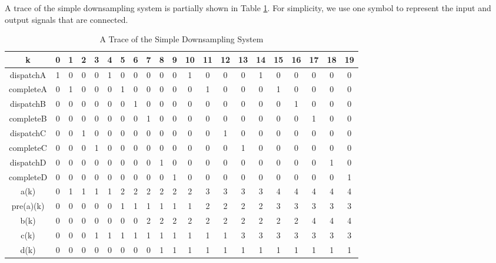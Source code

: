 A trace of the simple downsampling system is partially shown in Table \ref{tab:table1}. For simplicity, we use one symbol to represent the input and output signals that are connected.
\begin{table}[h!]
\begin{center}
\caption{A Trace of the Simple Downsampling System}
\label{tab:table1}
\begin{tabular}{ |c|c|c|c|c|c|c|c|c|c|c|c|c|c|c|c|c|c|c|c|c|} 
\hline
            k & 0 & 1 & 2 & 3 & 4 & 5 & 6 & 7 & 8 & 9 & 10  & 11 & 12 & 13 & 14 & 15 & 16 & 17 & 18 & 19 \\
\hline
dispatchA  & 1 & 0 & 0 & 0 & 1 & 0 & 0 & 0 & 0 & 0 & 1 & 0 & 0 & 0 & 1 & 0 & 0 & 0 & 0 & 0  \\ 
\hline
completeA & 0 & 1 & 0 & 0 & 0 & 1 & 0 & 0 & 0 & 0 & 0 & 1 & 0 & 0 & 0 & 1 & 0 & 0 & 0 & 0  \\ 
\hline
dispatchB & 0 & 0 & 0 & 0 & 0 & 0 & 1 & 0 & 0 & 0 & 0 & 0 & 0 & 0 & 0 & 0 & 1 & 0 & 0 & 0  \\ 
\hline
completeB & 0 & 0 & 0 &0 & 0 & 0 & 0 & 1 & 0 & 0 & 0 & 0 & 0 & 0 & 0 & 0 & 0 & 1 & 0 & 0 \\ 
\hline
dispatchC & 0 & 0 & 1 & 0 & 0 & 0 & 0 & 0 & 0 & 0 & 0 & 0 & 1 & 0 & 0 & 0 & 0 & 0 & 0 & 0  \\ 
\hline
completeC & 0 & 0 & 0 & 1  & 0 & 0 & 0 & 0 & 0 & 0 & 0 & 0 & 0 & 1 & 0 & 0 & 0 & 0 & 0 & 0 \\ 
\hline
dispatchD & 0 & 0 & 0 & 0 & 0 & 0 & 0 & 0 & 1 & 0 & 0 & 0 & 0 & 0 & 0 & 0 & 0 & 0 & 1 & 0 \\ 
\hline
completeD & 0 & 0 & 0 & 0  & 0 & 0 & 0 & 0 & 0 & 1 & 0 & 0 & 0 & 0 & 0 & 0 & 0 & 0 & 0 & 1 \\ 
\hline
a(k) & 0 & 1 & 1 & 1 & 1 & 2 & 2 & 2 & 2 & 2 & 2 & 3 & 3 & 3 & 3 & 4 & 4 & 4 & 4 & 4 \\
\hline
pre(a)(k) & 0 & 0 & 0 & 0 & 0 & 1 & 1 & 1 & 1 & 1 & 1 & 2 & 2 & 2 & 2 & 3 & 3 & 3 & 3 & 3 \\
\hline
b(k) & 0 & 0 & 0 & 0 & 0 & 0 & 0 & 2 & 2 & 2 & 2 & 2 & 2 & 2 & 2 & 2 & 2 & 4 & 4 & 4 \\
\hline
c(k) & 0 & 0 & 0 & 1 & 1 & 1 & 1 & 1 & 1 & 1 & 1 & 1 & 1 & 3 & 3 & 3 & 3 & 3 & 3 & 3 \\
\hline
d(k) & 0 & 0 & 0 & 0 & 0 & 0 & 0 & 0 & 1 & 1 & 1 & 1 & 1 & 1 & 1 & 1 & 1 & 1 & 1 & 1 \\
\hline
\end{tabular}
\end{center}
\end{table}

